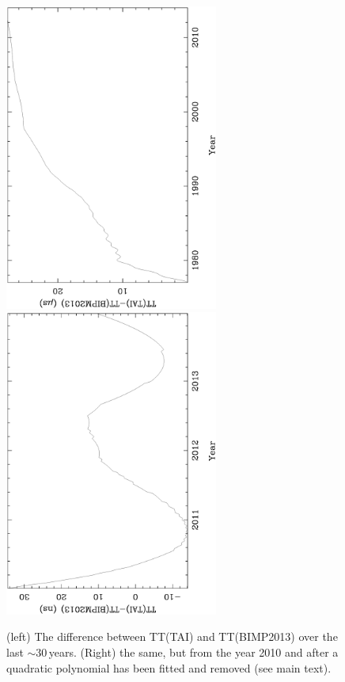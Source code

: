 \documentclass{raa}            %
\begin{document}
\begin{figure}
\includegraphics[angle=-90,width=7cm]{timeDiff.ps}
\includegraphics[angle=-90,width=7cm]{timeDiff2010.ps}
\caption{(left) The difference between TT(TAI) and TT(BIMP2013) over the last $\sim$30\,years.  (Right) the same, but from the year 2010 and after a quadratic polynomial has been fitted and removed (see main text).} \label{fg:timeDiff}
\end{figure}
\end{document}
